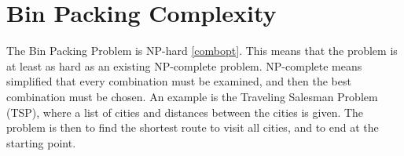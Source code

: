 \section{Bin Packing Complexity}
The Bin Packing Problem is NP-hard \ref{combopt}. This means that the problem is at least as hard as an existing NP-complete problem. NP-complete means simplified that every combination must be examined, and then the best combination must be chosen. An example is the Traveling Salesman Problem (TSP), where a list of cities and distances between the cities is given. The problem is then to find the shortest route to visit all cities, and to end at the starting point. 